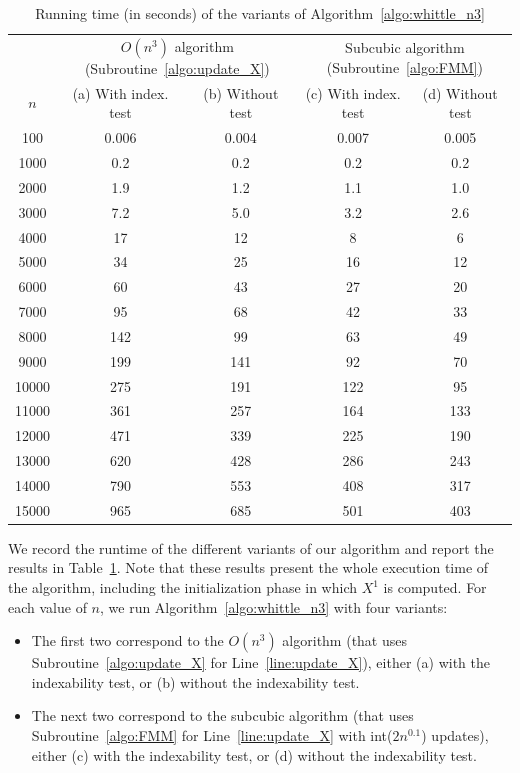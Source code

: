 \documentclass[acmsmall,screen,anonymous]{acmart}
\begin{document}
\begin{table}[ht]
    \caption{Running time (in seconds) of the variants of Algorithm~\ref{algo:whittle_n3}}
    \label{table:running_time}
    \begin{tabular}{|c|c|c||c|c|}
        \hline
        &\multicolumn{2}{c||}{$O(n^3)$ algorithm (Subroutine~\ref{algo:update_X})} & \multicolumn{2}{c|}{Subcubic algorithm (Subroutine~\ref{algo:FMM})}\\
        $n$    &  (a) With index. test &  (b) Without test  & (c) With index. test &  (d) Without test  \\
        \hline
        100 & 0.006 & 0.004 & 0.007 & 0.005 \\
        1000 &   0.2 &   0.2 &   0.2 &   0.2 \\
        2000 &   1.9 &   1.2 &   1.1 &   1.0 \\
        3000 &   7.2 &   5.0 &   3.2 &   2.6 \\
        4000 &    17 &    12 &     8 &     6 \\
        5000 &    34 &    25 &    16 &    12 \\
        6000 &    60 &    43 &    27 &    20 \\
        7000 &    95 &    68 &    42 &    33 \\
        8000 &   142 &    99 &    63 &    49 \\
        9000 &   199 &   141 &    92 &    70 \\
        10000 &   275 &   191 &   122 &    95 \\
        11000 &   361 &   257 &   164 &   133 \\
        12000 &   471 &   339 &   225 &   190 \\
        13000 &   620 &   428 &   286 &   243 \\
        14000 &   790 &   553 &   408 &   317 \\
        15000 &   965 &   685 &   501 &   403 \\
        \hline
    \end{tabular}
\end{table}
We record the runtime of the different variants of our algorithm and report the results in Table~\ref{table:running_time}. Note that these results present the whole execution time of the algorithm, including the initialization phase in which $X^1$ is computed. For each value of $n$, we run Algorithm~\ref{algo:whittle_n3} with four variants: 
\begin{itemize}
    \item The first two correspond to the $O(n^3)$ algorithm (that uses Subroutine~\ref{algo:update_X} for Line~\ref{line:update_X}), either (a) with the indexability test, or (b) without the indexability test. 
    \item The next two correspond to the subcubic algorithm (that uses Subroutine~\ref{algo:FMM} for Line~\ref{line:update_X} with int($2n^{0.1}$) updates), either (c) with the indexability test, or (d) without the indexability test.
\end{itemize}
\end{document}
